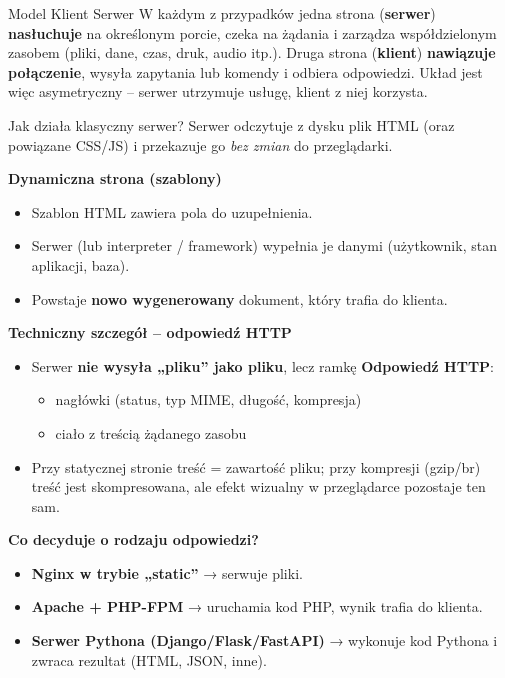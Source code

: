 \documentclass[10pt,compress,usenames,dvipsnames,aspectratio=169]{beamer}
\begin{document}
\begin{frame}{Model Klient Serwer}
{  W każdym z przypadków jedna strona (\textbf{serwer}) \textbf{nasłuchuje} na określonym porcie, czeka na żądania i zarządza współdzielonym zasobem (pliki, dane, czas, druk, audio itp.). Druga strona (\textbf{klient}) \textbf{nawiązuje połączenie}, wysyła zapytania lub komendy i odbiera odpowiedzi. Układ jest więc asymetryczny – serwer utrzymuje usługę, klient z niej korzysta.
  }
  \vfill
\end{frame}

\begin{frame}{Jak działa klasyczny serwer?}
\small
  Serwer odczytuje z dysku plik HTML (oraz powiązane CSS/JS) i przekazuje go \emph{bez zmian} do przeglądarki.

  \vspace{1ex}
  \textbf{Dynamiczna strona (szablony)}
  \begin{itemize}

    \item Szablon HTML zawiera pola do uzupełnienia.
    \item Serwer (lub interpreter / framework) wypełnia je danymi (użytkownik, stan aplikacji, baza).
    \item Powstaje \textbf{nowo wygenerowany} dokument, który trafia do klienta.
  \end{itemize}

  \vspace{1ex}
  \textbf{Techniczny szczegół – odpowiedź HTTP}
  \begin{itemize}
    \item Serwer \textbf{nie wysyła „pliku” jako pliku}, lecz ramkę \textbf{Odpowiedź HTTP}:
      \begin{itemize}\small
        \item nagłówki (status, typ MIME, długość, kompresja)
        \item ciało z treścią żądanego zasobu
      \end{itemize}
    \item Przy statycznej stronie treść = zawartość pliku; przy kompresji (gzip/br) treść jest skompresowana, ale efekt wizualny w przeglądarce pozostaje ten sam.
  \end{itemize}

  \vspace{1ex}
  \textbf{Co decyduje o rodzaju odpowiedzi?}
  \begin{itemize}
    \item \textbf{Nginx w trybie „static”} → serwuje pliki.
    \item \textbf{Apache + PHP-FPM} → uruchamia kod PHP, wynik trafia do klienta.
    \item \textbf{Serwer Pythona (Django/Flask/FastAPI)} → wykonuje kod Pythona i zwraca rezultat (HTML, JSON, inne).
  \end{itemize}
\end{frame}
\end{document}
